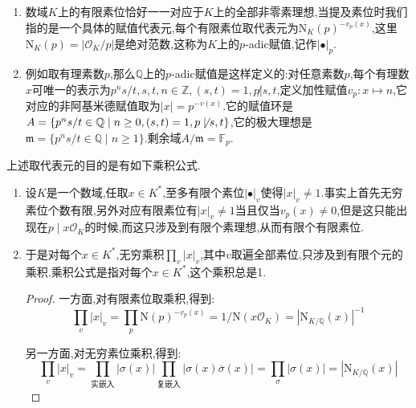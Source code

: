 \begin{enumerate}
\begin{proof}
		任取非0元$t\in\mathscr{O}_K$,把$x$的整方程记作$x^m+a_{m-1}x^{m-1}+\cdots+a_0=0$.如果$|t|>1$,得到$|a_{m-1}t^{m-1}+\cdots+a_0|\le|t|^{m-1}$,但是$|t^m|>|t|^{m-1}$矛盾.于是对任意的非0元$t\in\mathscr{O}_K$有$|t|\le1$.取$\mathscr{O}_K$中赋值小于1的元和0的并构成的集合$p$,那么$p$是$\mathscr{O}_K$的一个非0理想(不是零理想因为我们不考虑平凡赋值).按照$|\alpha_1\alpha_2|<1$则必然有某个$|\alpha_i|<1$得到$p$是素理想.现在任取$\alpha\in K^*$,任取$\pi\in p-p^2$,那么$\alpha/\pi^{v_P(\alpha)}\mathscr{O}_K=I/J$.这里$I,J$是和$p$互素的整理想.于是$J\not\subseteq p$,于是可以找到$\beta_2\in J$满足$\beta_2\not\in p$.于是$|\beta_2|=1$.现在取$\beta_1=\beta_2\alpha/\pi^{v_P(\alpha)}\in I$.那么$\beta_1\not\in P$,并且$v_p(\beta_1)=v_p(\beta_2)$.并且$|\beta_1|=1$.于是按照赋值的乘性,得到$|\alpha|=C^{-v_P(\alpha)},C=|\pi|^{-1}>1$.
	\end{proof}
	\item 数域$K$上的有限素位恰好一一对应于$K$上的全部非零素理想,当提及素位时我们指的是一个具体的赋值代表元,每个有限素位取代表元为$\mathrm{N}_K(p)^{-v_p(x)}$,这里$\mathrm{N}_K(p)=|\mathscr{O}_K/p|$是绝对范数,这称为$K$上的$p$-adic赋值,记作$|\bullet|_p$.
	\item 例如取有理素数$p$,那么$\mathbb{Q}$上的$p$-adic赋值是这样定义的:对任意素数$p$,每个有理数$x$可唯一的表示为$p^ns/t,s,t,n\in\mathbb{Z},(s,t)=1,p\not| s,t$,定义加性赋值$v_p:x\mapsto n$,它对应的非阿基米德赋值取为$|x|=p^{-v(x)}$.它的赋值环是$A=\{p^ns/t\in\mathbb{Q}\mid n\ge0,(s,t)=1,p\not\mid s,t\}$,它的极大理想是$\mathfrak{m}=\{p^ns/t\in\mathbb{Q}\mid n\ge1\}$.剩余域$A/\mathfrak{m}=\mathbb{F}_p$.
\end{enumerate}

上述取代表元的目的是有如下乘积公式.
\begin{enumerate}
	\item 设$K$是一个数域,任取$x\in K^*$,至多有限个素位$|\bullet|_v$使得$|x|_v\not=1$.事实上首先无穷素位个数有限,另外对应有限素位有$|x|_v\not=1$当且仅当$v_p(x)\not=0$,但是这只能出现在$p\mid x\mathscr{O}_K$的时候,而这只涉及到有限个素理想,从而有限个有限素位.
	\item 于是对每个$x\in K^*$,无穷乘积$\prod_v|x|_v$,其中$v$取遍全部素位,只涉及到有限个元的乘积.乘积公式是指对每个$x\in K^*$,这个乘积总是1.
	\begin{proof}
		
		一方面,对有限素位取乘积,得到:
		$$\prod_v|x|_v=\prod_p\mathrm{N}(p)^{-v_p(x)}=1/\mathrm{N}(x\mathscr{O}_K)=|\mathrm{N}_{K/\mathbb{Q}}(x)|^{-1}$$
		
		另一方面,对无穷素位乘积,得到:
		$$\prod_v|x|_v=\prod_{\text{实嵌入}}|\sigma(x)|\prod_{\text{复嵌入}}|\sigma(x)\overline{\sigma}(x)|=\prod_{\sigma}|\sigma(x)|=|\mathrm{N}_{K/\mathbb{Q}}(x)|$$
	\end{proof}
\end{enumerate}


